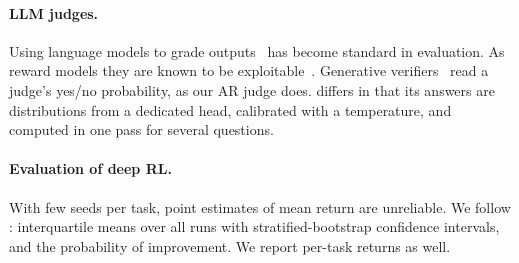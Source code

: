 \paragraph{LLM judges.} Using language models to grade outputs~\cite{zheng2023judging,liu2023geval} has become standard
in evaluation. As reward models they are known to be exploitable~\cite{gao2023scaling,skalse2022defining}. Generative
verifiers~\cite{zhang2024genverifier} read a judge's yes/no probability, as our AR judge does. \kev{} differs in that its
answers are distributions from a dedicated head, calibrated with a temperature, and computed in one pass for several
questions.

\paragraph{Evaluation of deep RL.} With few seeds per task, point estimates of mean return are unreliable. We follow
\citet{agarwal2021deep}: interquartile means over all runs with stratified-bootstrap confidence intervals, and the
probability of improvement. We report per-task returns as well.
